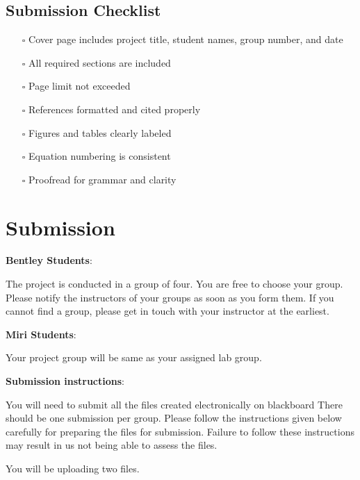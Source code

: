\documentclass[
  12pt,
  a4paperpaper,
  DIV=11,
  numbers=noendperiod]{scrartcl}
\providecommand{\tightlist}{%
  \setlength{\itemsep}{0pt}\setlength{\parskip}{0pt}}\usepackage{longtable,booktabs,array}
\begin{document}
\subsection{Submission Checklist}\label{submission-checklist}

\begin{itemize}
\tightlist
\item[$\square$]
  Cover page includes project title, student names, group number, and
  date\\
\item[$\square$]
  All required sections are included\\
\item[$\square$]
  Page limit not exceeded\\
\item[$\square$]
  References formatted and cited properly\\
\item[$\square$]
  Figures and tables clearly labeled\\
\item[$\square$]
  Equation numbering is consistent\\
\item[$\square$]
  Proofread for grammar and clarity
\end{itemize}

\section{Submission}\label{submission}

\textbf{Bentley Students}:

The project is conducted in a group of four. You are free to choose your
group. Please notify the instructors of your groups as soon as you form
them. If you cannot find a group, please get in touch with your
instructor at the earliest.

\textbf{Miri Students}:

Your project group will be same as your assigned lab group.

\textbf{Submission instructions}:

You will need to submit all the files created electronically on
blackboard There should be one submission per group. Please follow the
instructions given below carefully for preparing the files for
submission. Failure to follow these instructions may result in us not
being able to assess the files.

You will be uploading two files.
\end{document}

